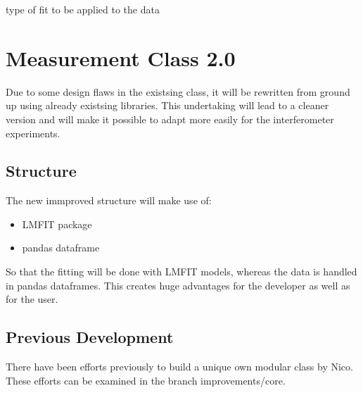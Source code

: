 \documentclass[letterpaper,10pt,english]{sphinxmanual}
\begin{document}
\begin{fulllineitems}
\begin{fulllineitems}
\end{fulllineitems}


\begin{fulllineitems}
\label{\detokenize{measurement:measurement.Measurement.type_of_fit}}
type of fit to be applied to the data

\end{fulllineitems}


\end{fulllineitems}



\chapter{Measurement Class 2.0}
\label{\detokenize{measurement2:measurement-class-2-0}}\label{\detokenize{measurement2::doc}}
Due to some design flaws in the existsing {\hyperref[\detokenize{measurement:measurement.Measurement}]{}} class, it will be rewritten from ground up using already existsing libraries. This undertaking will lead to a cleaner version and will make it possible to adapt {\hyperref[\detokenize{measurement:measurement.Measurement}]{}} more easily for the interferometer experiments.


\section{Structure}
\label{\detokenize{measurement2:structure}}
The new immproved structure will make use of:
\begin{itemize}
\item {} 
LMFIT package

\item {} 
pandas dataframe

\end{itemize}

So that the fitting will be done with LMFIT models, whereas the data is handled in pandas dataframes. This creates huge advantages for the developer as well as for the user.


\section{Previous Development}
\label{\detokenize{measurement2:previous-development}}
There have been efforts previously to build a unique own modular {\hyperref[\detokenize{measurement:measurement.Measurement}]{}} class by Nico. These efforts can be examined in the branch improvements/core.
\end{document}
